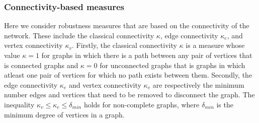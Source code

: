 \documentclass[10pt,a4paper]{article}
\begin{document}
	\subsubsection{Connectivity-based measures}
	Here we consider robustness measures that are based on the connectivity of the network. These include the classical connectivity $\kappa$, edge connectivity $\kappa_e$, and vertex connectivity $\kappa_v$. Firstly, the classical connectivity $\kappa$ is a measure whose value $\kappa=1$ for graphs in which there is a path between any pair of vertices that is connected graphs and $\kappa=0$ for unconnected graphs that is graphs in which atleast one pair of vertices  for which no path exists between them. Secondly, the edge connectivity $\kappa_e$ and vertex connectivity $\kappa_v$ are respectively the minimum number edges and vertices that need to be removed to disconnect the graph. The inequality $\kappa_v \leq \kappa_e \leq \delta_{min}$ holds for non-complete graphs, where $\delta_{min}$ is the minimum degree of vertices in a graph.
\end{document}
